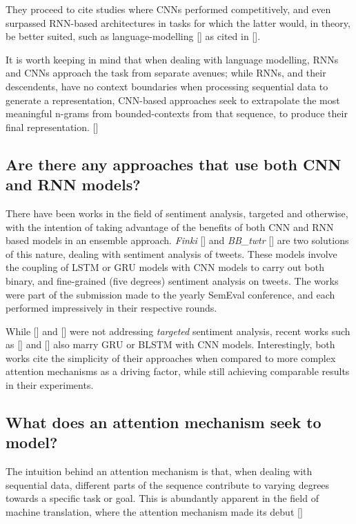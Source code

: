 \documentclass[12pt, a4paper]{report}
\theoremstyle{definition}
\theoremstyle{definition}%
\theoremstyle{definition}%
\theoremstyle{definition}%
\theoremstyle{definition}%
\theoremstyle{definition}%
\renewcommand{\cite}[1]{[\citealp{#1}]}
\begin{document}
They proceed to cite studies where CNNs performed competitively, and even surpassed RNN-based architectures in tasks for which the latter would, in theory, be better suited, such as language-modelling \cite{dauphin2017} as cited in \cite{young2017}.

It is worth keeping in mind that when dealing with language modelling, RNNs and CNNs approach the task from separate avenues; while RNNs, and their descendents, have no context boundaries when processing sequential data to generate a representation, CNN-based approaches seek to extrapolate the most meaningful n-grams from bounded-contexts from that sequence, to produce their final representation. \cite{young2017}

\subsection{Are there any approaches that use both CNN and RNN models?}
There have been works in the field of sentiment analysis, targeted and otherwise, with the intention of taking advantage of the benefits of both CNN and RNN based models in an ensemble approach. \textit{Finki} \cite{stojanovski2016} and \textit{BB\_twtr} \cite{cliche2017} are two solutions of this nature, dealing with sentiment analysis of tweets. These models involve the coupling of LSTM or GRU models with CNN models to carry out both binary, and fine-grained (five degrees) sentiment analysis on tweets. The works were part of the submission made to the yearly SemEval conference, and each performed impressively in their respective rounds.

While \cite{stojanovski2016} and \cite{cliche2017} were not addressing \textit{targeted} sentiment analysis, recent works such as \cite{xue2018} and \cite{xinli2018} also marry GRU or BLSTM with CNN models. Interestingly, both works cite the simplicity of their approaches when compared to more complex attention mechanisms as a driving factor, while still achieving comparable results in their experiments.  

\subsection{What does an attention mechanism seek to model?}
The intuition behind an attention mechanism is that, when dealing with sequential data, different parts of the sequence contribute to varying degrees towards a specific task or goal. This is abundantly apparent in the field of machine translation, where the attention mechanism made its debut \cite{bahdanau2014}  
\end{document}
